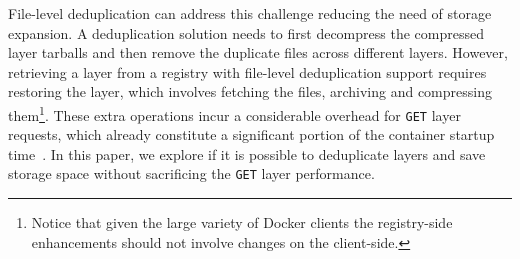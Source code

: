File-level deduplication can address this challenge reducing the need of storage expansion.
%
A deduplication solution needs to first decompress
the compressed layer tarballs and then remove the duplicate files across
different layers.
%
%
However, retrieving a layer from a registry with file-level
deduplication support requires restoring the layer,
which involves fetching the files, archiving and compressing them\footnote{Notice
that given the large variety of Docker clients the registry-side enhancements
should not involve changes on the client-side.}.
%
These extra operations incur a considerable overhead for
\texttt{GET} layer requests, which already constitute a significant portion of
the container startup time~\cite{slacker}.
%
In this paper, we explore if it is possible to deduplicate layers and save storage space
without sacrificing the \texttt{GET} layer performance.
%   





